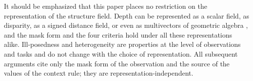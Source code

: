 It should be emphasized that this paper places no restriction on the representation of the structure field. Depth can be represented as a scalar field, as disparity, as a signed distance field, or even as multivectors of geometric algebra \citep{hestenes1984,dorst2007}, and the mask form and the four criteria hold under all these representations alike. Ill-posedness and heterogeneity are properties at the level of observations and tasks and do not change with the choice of representation. All subsequent arguments cite only the mask form of the observation and the source of the values of the context rule; they are representation-independent.

